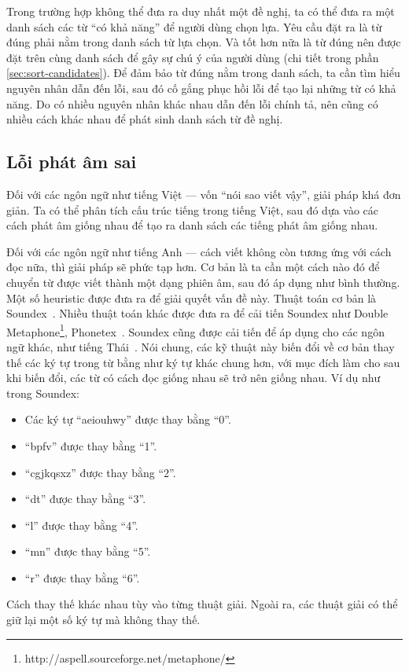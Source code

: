 \documentclass[a4paper,oneside,14pt]{extbook} %
\begin{document}
Trong trường hợp không thể đưa ra duy nhất một đề nghị, ta có thể đưa
ra một danh sách các từ ``có khả năng'' để người dùng chọn lựa. Yêu
cầu đặt ra là từ đúng phải nằm trong danh sách từ lựa chọn. Và tốt hơn
nữa là từ đúng nên được đặt trên cùng danh sách để gây sự chú ý của
người dùng (chi tiết trong phần \ref{sec:sort-candidates}). Để đảm
bảo từ đúng nằm trong danh sách, ta cần tìm hiểu nguyên nhân dẫn đến
lỗi, sau đó cố gắng phục hồi lỗi để tạo lại những từ có khả năng. Do
có nhiều nguyên nhân khác nhau dẫn đến lỗi chính tả, nên cũng có nhiều
cách khác nhau để phát sinh danh sách từ đề nghị.


\subsection{Lỗi phát âm sai}

Đối với các ngôn ngữ như tiếng Việt --- vốn ``nói sao viết vậy'', giải
pháp khá đơn giản. Ta có thể phân tích cấu trúc tiếng trong tiếng
Việt, sau đó dựa vào các cách phát âm giống nhau để tạo ra danh sách
các tiếng phát âm giống nhau. 

Đối với các ngôn ngữ như tiếng Anh --- cách viết không còn tương ứng
với cách đọc nữa, thì giải pháp sẽ phức tạp hơn. Cơ bản là ta cần một
cách nào đó để chuyển từ được viết thành một dạng phiên âm, sau đó áp
dụng như bình thường. Một số heuristic được đưa ra để giải quyết vấn
đề này. Thuật toán cơ bản là Soundex~\cite{knuth73}. Nhiều thuật toán
khác được đưa ra để cải tiến Soundex như Double
Metaphone\footnote{http://aspell.sourceforge.net/metaphone/}, 
Phonetex~\cite{phonetex}. Soundex cũng được cải tiến để áp dụng cho
các ngôn ngữ khác, như tiếng Thái~\cite{tsdx}. Nói chung, các kỹ thuật
này biến đổi về cơ bản thay thế các ký tự trong từ bằng như ký tự khác
chung hơn, với mục đích làm cho sau khi biến đổi, các từ có cách đọc
giống nhau sẽ trở nên giống nhau. Ví dụ như trong Soundex:
\begin{itemize}
\item Các ký tự ``aeiouhwy'' được thay bằng ``0''.
\item ``bpfv'' được thay bằng ``1''.
\item ``cgjkqsxz'' được thay bằng ``2''.
\item ``dt'' được thay bằng ``3''.
\item ``l'' được thay bằng ``4''.
\item ``mn'' được thay bằng ``5''.
\item ``r'' được thay bằng ``6''.
\end{itemize}
Cách thay thế khác nhau tùy vào từng thuật giải. Ngoài ra, các
thuật giải có thể giữ lại một số ký tự mà không thay thế.
\end{document}
